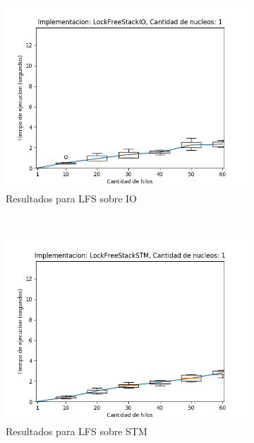 \begin{appendices}
\begin{figure}[t]
\begin{subfigure}[b]{0.49\textwidth}
        \includegraphics[width=\textwidth]{images/numberOfThreads/plots/expLFSIO-1}
        \caption{Resultados para LFS sobre IO}
        \label{subfig:numberOfThreads-lfsio-1}
    \end{subfigure}
    ~
    \begin{subfigure}[b]{0.49\textwidth}
        \includegraphics[width=\textwidth]{images/numberOfThreads/plots/expLFSSTM-1}
        \caption{Resultados para LFS sobre STM}
        \label{subfig:numberOfThreads-lfsstm-1}
    \end{subfigure}
    \begin{subfigure}[b]{0.49\textwidth}

\end{subfigure}
\end{figure}
\end{appendices}
